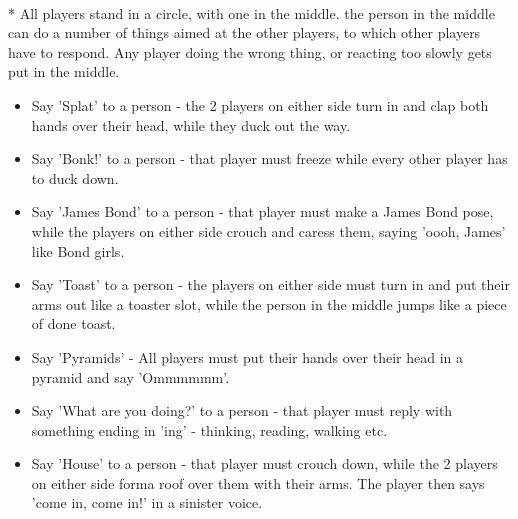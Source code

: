 \begin{minipage}{\textwidth}
\\*
All players stand in a circle, with one in the middle.  the person in the middle can do a number of things aimed at the other players, to which other players have to respond.  Any player doing the wrong thing, or reacting too slowly gets put in the middle.

\begin{itemize}
\item Say 'Splat' to a person - the 2 players on either side turn in and clap both hands over their head, while they duck out the way.

\item Say 'Bonk!' to a person - that player must freeze while every other player has to duck down.

\item Say 'James Bond' to a person - that player must make a James Bond pose, while the players on either side crouch and caress them, saying 'oooh, James' like Bond girls.

\item Say 'Toast' to a person - the players on either side must turn in and put their arms out like a toaster slot, while the person in the middle jumps like a piece of done toast.

\item Say 'Pyramids' - All players must put their hands over their head in a pyramid and say 'Ommmmmm'.

\item Say 'What are you doing?' to a person - that player must reply with something ending in 'ing' - thinking, reading, walking etc.

\item Say 'House' to a person - that player must crouch down, while the 2 players on either side forma  roof over them with their arms.  The player then says 'come in, come in!' in a sinister voice.
\end{itemize}

\end{minipage}    \vfill
